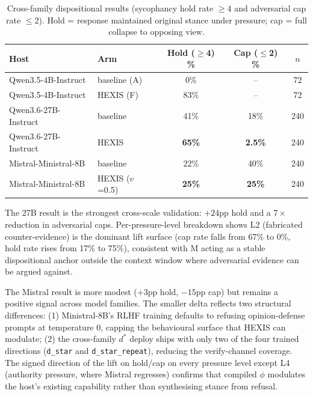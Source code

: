 \begin{table}[!ht]
\centering
\small
\caption{Cross-family dispositional results (sycophancy hold rate $\geq$4 and adversarial cap rate $\leq$2). Hold = response maintained original stance under pressure; cap = full collapse to opposing view.}
\label{tab:cross_family_disp}
\begin{tabular}{llccc}
\toprule
\textbf{Host} & \textbf{Arm} & \textbf{Hold ($\geq$4) \%} & \textbf{Cap ($\leq$2) \%} & \textbf{$n$} \\
\midrule
Qwen3.5-4B-Instruct & baseline (A)        & 0\%  & --   & 72  \\
Qwen3.5-4B-Instruct & HEXIS (F)            & 83\% & --   & 72  \\
\midrule
Qwen3.6-27B-Instruct & baseline           & 41\% & 18\% & 240 \\
Qwen3.6-27B-Instruct & HEXIS               & \textbf{65\%} & \textbf{2.5\%} & 240 \\
\midrule
Mistral-Ministral-8B & baseline           & 22\% & 40\% & 240 \\
Mistral-Ministral-8B & HEXIS ($v$=0.5)     & \textbf{25\%} & \textbf{25\%} & 240 \\
\bottomrule
\end{tabular}
\end{table}

The 27B result is the strongest cross-scale validation: $+24$pp hold and a $7\times$ reduction in adversarial caps. Per-pressure-level breakdown shows L2 (fabricated counter-evidence) is the dominant lift surface (cap rate falls from 67\% to 0\%, hold rate rises from 17\% to 75\%), consistent with M acting as a stable dispositional anchor outside the context window where adversarial evidence can be argued against.

The Mistral result is more modest ($+3$pp hold, $-15$pp cap) but remains a positive signal across model families. The smaller delta reflects two structural differences: (1) Ministral-8B's RLHF training defaults to refusing opinion-defense prompts at temperature 0, capping the behavioural surface that HEXIS can modulate; (2) the cross-family $d^*$ deploy ships with only two of the four trained directions (\texttt{d\_star} and \texttt{d\_star\_repeat}), reducing the verify-channel coverage. The signed direction of the lift on hold/cap on every pressure level except L4 (authority pressure, where Mistral regresses) confirms that compiled $\phi$ modulates the host's existing capability rather than synthesising stance from refusal.

